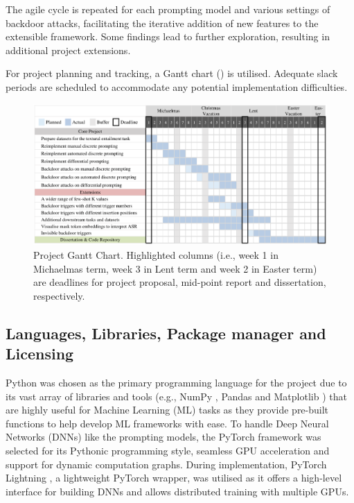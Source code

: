 The agile cycle is repeated for each prompting model and various settings of backdoor attacks, facilitating the iterative addition of new features to the extensible framework. Some findings lead to further exploration, resulting in additional project extensions.

For project planning and tracking, a Gantt chart () is utilised. Adequate slack periods are scheduled to accommodate any potential implementation difficulties.
\begin{figure}[!ht]
    \centering
    \includegraphics[width=\hsize]{figures/preparation_media/diss-gantt-chart3.pdf}
    \caption{Project Gantt Chart. Highlighted columns (i.e., week 1 in Michaelmas term, week 3 in Lent term and week 2 in Easter term) are deadlines for project proposal, mid-point report and dissertation, respectively.}
    \label{fig:prepare-diss-gantt-chart}
\end{figure}

\subsection{Languages, Libraries, Package manager and Licensing}
Python was chosen as the primary programming language for the project due to its vast array of libraries and tools (e.g., NumPy \cite{Harris20NumPy}, Pandas \cite{mckinney10Pandas} and Matplotlib \cite{Hunter07Matplotlib}) that are highly useful for Machine Learning (ML) tasks as they provide pre-built functions to help develop ML frameworks with ease. To handle Deep Neural Networks (DNNs) like the prompting models, the PyTorch \cite{Paszke19PyTorch} framework was selected for its Pythonic programming style, seamless GPU acceleration and support for dynamic computation graphs. During implementation, PyTorch Lightning \cite{Falcon19PL}, a lightweight PyTorch wrapper, was utilised as it offers a high-level interface for building DNNs and allows distributed training with multiple GPUs. 

